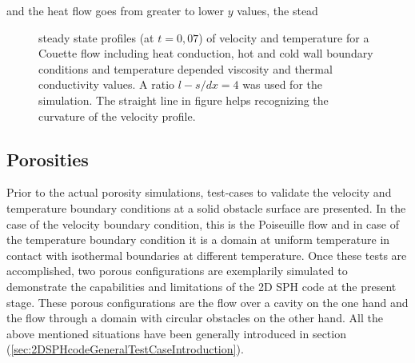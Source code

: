 \documentclass[11pt,a4paper,twoside]{report}
\begin{document}
and the heat flow goes from greater to lower $y$ values, the stead
\begin{figure}
 \centering
\label{fig:CompCouette_UT}
\caption[steady State profiles compressible Couette]{steady state profiles (at $t=0,07$) of velocity and temperature for a Couette flow including heat conduction, hot and cold wall boundary conditions and temperature depended viscosity and thermal conductivity values. A ratio $l-s/dx=4$ was used for the simulation. The straight line in figure  helps recognizing the curvature of the velocity profile.}
\end{figure}

\subsection{Porosities}
Prior to the actual porosity simulations, test-cases to validate the velocity and temperature boundary conditions at a solid obstacle surface are presented. In the case of the velocity boundary condition, this is the Poiseuille flow and in case of the temperature boundary condition it is a domain at uniform temperature in contact with isothermal boundaries at different temperature. Once these tests are accomplished, two porous configurations are exemplarily simulated to demonstrate the capabilities and limitations of the 2D SPH code at the present stage. These porous configurations are the flow over a cavity on the one hand and the flow through a domain with circular obstacles on the other hand. All the above mentioned situations have been generally introduced in section (\ref{sec:2DSPHcodeGeneralTestCaseIntroduction}). 
\end{document}
